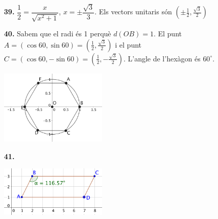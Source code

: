 \documentclass[a4paper, pdf, twoside]{book}
\begin{document}
\begin{multicols}{2}
\begin{enumerate}
\vspace{0.25cm}
\item[\fontfamily{phv}\selectfont\color{blue}\textbf{39. }] 
$\dfrac {1}{2}=\dfrac {x}{\sqrt {x^2+1}}$, $x=\pm \dfrac {\sqrt {3}}{3}$. Els vectors unitaris són $(\pm \frac {1}{2}, \frac {\sqrt {3}}{2})$
\vspace{0.25cm}
\item[\fontfamily{phv}\selectfont\color{blue}\textbf{40. }] 
Sabem que el radi és 1 perquè $d(OB)=1$. El punt $A=(\cos 60, \sin 60)=(\frac {1}{2}, \frac {\sqrt {3}}{2})$ i el punt $C=(\cos 60, -\sin 60)=(\frac {1}{2}, -\frac {\sqrt {3}}{2})$. L'angle de l'hexàgon és $60^\circ $.\par \includegraphics [width=0.4\textwidth ]{img-sol/t8-36}
\vspace{0.25cm}
\item[\fontfamily{phv}\selectfont\color{blue}\textbf{41. }] 
\mbox {}\par \includegraphics [width=0.4\textwidth ]{img-sol/t8-37}
 \end{enumerate}
\vspace{0.3cm}



\end{multicols}
\end{document}
